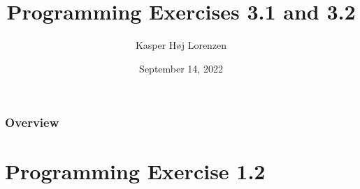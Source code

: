 \documentclass{beamer}
\title[Forward Kinematics]{Programming Exercises 3.1 and 3.2} %
\author{Kasper Høj Lorenzen} %
\institute[SDU Robotics] %
{
University of Southern Denmark \\ %
\medskip
\textit{kalor@mmmi.sdu.dk} %
}
\date{September 14, 2022} %
\begin{document}
\begin{frame}
\titlepage %
\end{frame}

\begin{frame}
\frametitle{Overview} %
\tableofcontents %
\end{frame}


\section{Programming Exercise 1.2} %
\end{document}

